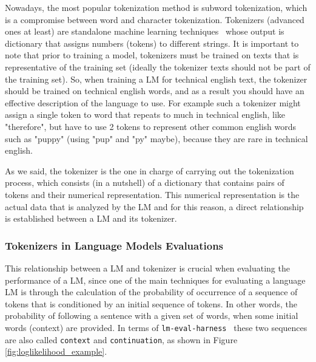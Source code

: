 Nowadays, the most popular tokenization method is subword tokenization, which is a compromise between word and character tokenization. 
Tokenizers (advanced ones at least) are standalone machine learning techniques~\cite{kudo_sentencepiece_2018,kudo_subword_2018,sennrich_neural_2016} whose output is dictionary that assigns numbers (tokens) to different strings. It is important to note that prior to training a model, tokenizers must be trained on texts that is representative of the training set (ideally the tokenizer texts should not be part of the training set). So, when training a \gls{LM} for technical english text, the tokenizer should be trained on technical english words, and as a result you should have an effective description of the language to use. For example such a tokenizer might assign a single token to word that repeats to much in technical english, like "therefore", but have to use 2 tokens to represent other common english words such as "puppy" (using "pup" and "py" maybe), because they are rare in technical english.

As we said, the tokenizer is the one in charge of carrying out the tokenization process, which consists (in a nutshell) of a dictionary that contains pairs of tokens and their numerical representation. This numerical representation is the actual data that is analyzed by the \gls{LM} and for this reason, a direct relationship is established between a \gls{LM} and its tokenizer.


\subsubsection*{Tokenizers in Language Models Evaluations}

This relationship between a \gls{LM} and tokenizer is crucial when evaluating the performance of a \gls{LM}, since one of the main techniques for evaluating a language \gls{LM} is through the calculation of the probability of occurrence of a sequence of tokens that is conditioned by an initial sequence of tokens. In other words, the probability of following a sentence with a given set of words, when some initial words (context) are provided. 
In terms of \texttt{lm-eval-harness}~\cite{biderman_lessons_2024} these two sequences are also called \texttt{context} and \texttt{continuation}, as shown in Figure \ref{fig:loglikelihood_example}.

